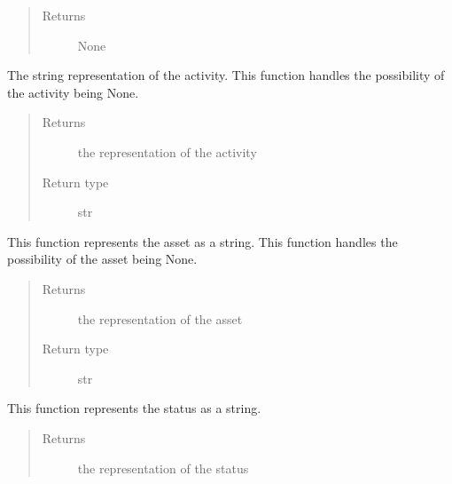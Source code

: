 \documentclass[letterpaper,10pt,english]{sphinxmanual}
\begin{document}
\begin{fulllineitems}
\begin{fulllineitems}
\begin{quote}
\begin{description}
\item[{Returns}] \leavevmode
None

\end{description}\end{quote}

\end{fulllineitems}


\begin{fulllineitems}
\label{state:state.State.print_activity}
The string representation of the activity. This function handles the         possibility of the activity being None.
\begin{quote}\begin{description}
\item[{Returns}] \leavevmode
the representation of the activity

\item[{Return type}] \leavevmode
str

\end{description}\end{quote}

\end{fulllineitems}


\begin{fulllineitems}
\label{state:state.State.print_asset}
This function represents the asset as a string. This function handles         the possibility of the asset being None.
\begin{quote}\begin{description}
\item[{Returns}] \leavevmode
the representation of the asset

\item[{Return type}] \leavevmode
str

\end{description}\end{quote}

\end{fulllineitems}


\begin{fulllineitems}
\label{state:state.State.print_status}
This function represents the status as a string.
\begin{quote}\begin{description}
\item[{Returns}] \leavevmode
the representation of the status


\end{description}
\end{quote}
\end{fulllineitems}
\end{fulllineitems}
\end{document}
